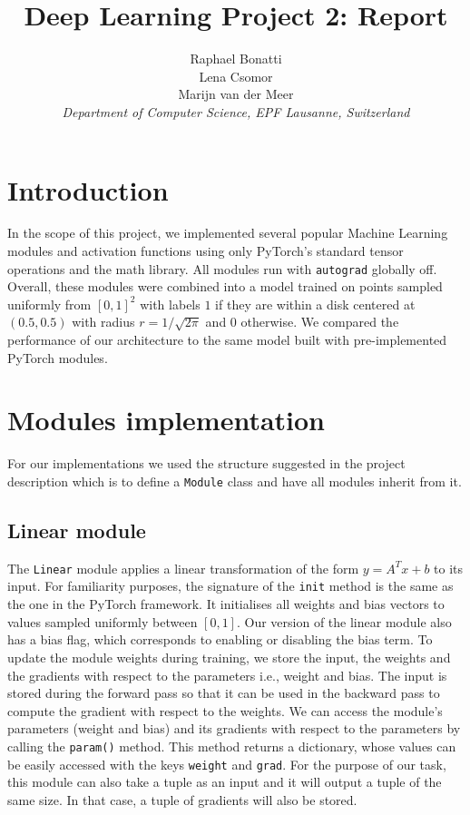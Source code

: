 \documentclass[10pt,conference,compsocconf]{IEEEtran}
\begin{document}
\title{Deep Learning Project 2: Report}

\author{
  Raphael Bonatti\\
  Lena Csomor\\
  Marijn van der Meer\\
  \textit{Department of Computer Science, EPF Lausanne, Switzerland}
}

\maketitle

\section{Introduction}\label{sec:introduction}
In the scope of this project, we implemented several popular Machine Learning modules and activation functions using only PyTorch's standard tensor operations and the math library. All modules run with \texttt{autograd} globally off. Overall, these modules were combined into a model trained on points sampled uniformly from $[0,1]^2$ with labels $1$ if they are within a disk centered at $(0.5, 0.5)$ with radius $r = 1/\sqrt{2\pi}$ and $0$ otherwise. We compared the performance of our architecture to the same model built with pre-implemented PyTorch modules.

\section{Modules implementation}
\label{sec:module-implementation}
For our implementations we used the structure suggested in the project description which is to define a
\texttt{Module} class and have all modules inherit from it. 




\subsection{Linear module}\label{subsec:linear}

The \texttt{Linear} module applies a linear transformation of the form $y=A^Tx
 +b$ to its input. For familiarity purposes, the signature of the \texttt{init} method is the same as the one in the PyTorch framework. It initialises all weights and bias vectors to values sampled uniformly between $[0,1]$. Our version of the linear module also has a bias flag, which corresponds to enabling or disabling the bias term. To update the module weights during training, we store the input, the weights and the gradients with respect to the parameters i.e., weight and bias. The input is stored during the forward pass so that it can be used in the backward pass to compute the gradient with respect to the weights. We can access the module's parameters (weight and bias) and its gradients with respect to the parameters by calling the \texttt{param()} method. This method returns a dictionary, whose values can be easily accessed with the keys \texttt{weight} and \texttt{grad}. For the purpose of our task, this module can also take a tuple as an input and it will output a tuple of the same size. In that case, a tuple  of gradients will also be stored.  
 
\end{document}
